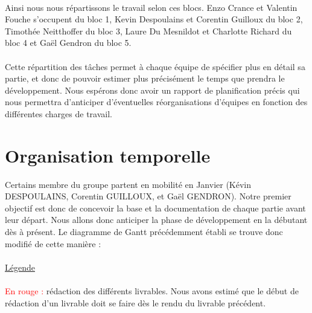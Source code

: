 \paragraph{}

Ainsi nous nous répartissons le travail selon ces blocs.
Enzo Crance et Valentin Fouche s’occupent du bloc 1, Kevin Despoulains et Corentin Guilloux du bloc 2, Timothée Neitthoffer du bloc 3, Laure Du Mesnildot et Charlotte Richard du bloc 4 et Gaël Gendron du bloc 5. 

\paragraph{}
Cette répartition des tâches permet à chaque équipe de spécifier plus en détail
sa partie, et donc de pouvoir estimer plus précisément le temps que prendra le
développement. Nous espérons donc avoir un rapport de planification précis qui
nous permettra d’anticiper d’éventuelles réorganisations d’équipes en fonction
des différentes charges de travail.

\section{Organisation temporelle}

Certains membre du groupe partent en mobilité en Janvier (Kévin DESPOULAINS,
Corentin GUILLOUX, et Gaël GENDRON). Notre premier objectif est donc de
concevoir la base et la documentation de chaque partie avant leur départ.
Nous allons donc anticiper la phase de développement en la débutant dès à
présent. Le diagramme de Gantt précédemment établi se trouve donc modifié de
cette manière :

\paragraph{}
\begin{mdframed}[frametitle={Figure 12 : Estimation de la planification des tâches}, innerbottommargin=10]
\begin{center}
\end{center}
\end{mdframed}

\paragraph{}
\underline{Légende}

\paragraph{}
\textcolor{red}{En rouge : } rédaction des différents livrables. Nous avons estimé que le début de rédaction d’un livrable doit se faire dès le rendu du livrable précédent.

